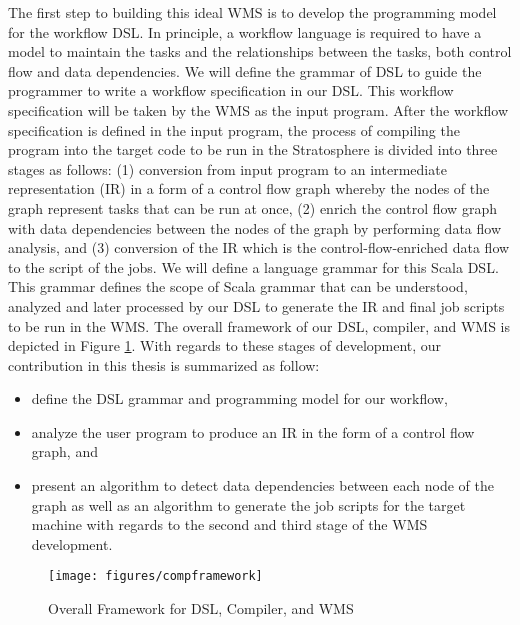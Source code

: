 The first step to building this ideal WMS is to develop the programming model for the workflow DSL. In principle, a workflow language is required to have a model to maintain the tasks and the relationships between the tasks, both control flow and data dependencies. We will define the grammar of DSL to guide the programmer to write a workflow specification in our DSL. This workflow specification will be taken by the WMS as the input program. After the workflow specification is defined in the input program, the process of compiling the program into the target code to be run in the Stratosphere is divided into three stages as follows: (1) conversion from input program to an intermediate representation (IR) in a form of a control flow graph whereby the nodes of the graph represent tasks that can be run at once, (2) enrich the control flow graph with data dependencies between the nodes of the graph by performing data flow analysis, and (3) conversion of the IR which is the control-flow-enriched data flow to the script of the jobs. We will define a language grammar for this Scala DSL. This grammar defines the scope of Scala grammar \cite{odersky2004scala} that can be understood, analyzed and later processed by our DSL to generate the IR and final job scripts to be run in the WMS. The overall framework of our DSL, compiler, and WMS is depicted in Figure \ref{fig:framework}. With regards to these stages of development, our contribution in this thesis is summarized as follow:
\begin{itemize}
\item define the DSL grammar and programming model for our workflow,
\item analyze the user program to produce an IR in the form of a control flow graph, and 
\item present an algorithm to detect data dependencies between each node of the graph as well as an algorithm to generate the job scripts for the target machine with regards to the second and third stage of the WMS development.
\end{itemize}

\begin{figure}
\centering
\texttt{[image: figures/compframework]}
\caption{Overall Framework for DSL, Compiler, and WMS}
\label{fig:framework}
\end{figure}

